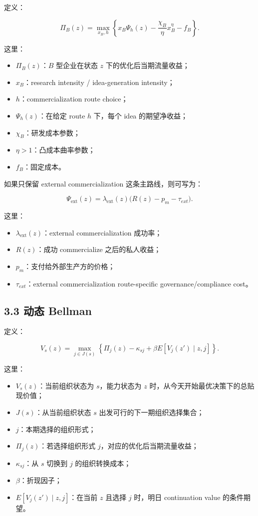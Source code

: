\documentclass[12pt]{ctexart}
\begin{document}
定义：

\[
\Pi_B(z)
=
\max_{x_B,h}
\left\{
x_B\Psi_h(z)-\frac{\chi_B}{\eta}x_B^\eta-f_B
\right\}.
\]

这里：

\begin{itemize}[leftmargin=2em]
    \item \(\Pi_B(z)\)：\(B\) 型企业在状态 \(z\) 下的优化后当期流量收益；
    \item \(x_B\)：research intensity / idea-generation intensity；
    \item \(h\)：commercialization route choice；
    \item \(\Psi_h(z)\)：在给定 route \(h\) 下，每个 idea 的期望净收益；
    \item \(\chi_B\)：研发成本参数；
    \item \(\eta>1\)：凸成本曲率参数；
    \item \(f_B\)：固定成本。
\end{itemize}

如果只保留 external commercialization 这条主路线，则可写为：

\[
\Psi_{\text{ext}}(z)
=
\lambda_{\text{ext}}(z)\bigl(R(z)-p_m-\tau_{ext}\bigr).
\]

这里：

\begin{itemize}[leftmargin=2em]
    \item \(\lambda_{\text{ext}}(z)\)：external commercialization 成功率；
    \item \(R(z)\)：成功 commercialize 之后的私人收益；
    \item \(p_m\)：支付给外部生产方的价格；
    \item \(\tau_{ext}\)：external commercialization route-specific governance/compliance cost。
\end{itemize}

\subsection{3.3 动态 Bellman}

定义：

\[
V_s(z)=
\max_{j\in J(s)}
\left\{
\Pi_j(z)-\kappa_{sj}
+\beta E[V_j(z')\mid z,j]
\right\}.
\]

这里：

\begin{itemize}[leftmargin=2em]
    \item \(V_s(z)\)：当前组织状态为 \(s\)，能力状态为 \(z\) 时，从今天开始最优决策下的总贴现价值；
    \item \(J(s)\)：从当前组织状态 \(s\) 出发可行的下一期组织选择集合；
    \item \(j\)：本期选择的组织形式；
    \item \(\Pi_j(z)\)：若选择组织形式 \(j\)，对应的优化后当期流量收益；
    \item \(\kappa_{sj}\)：从 \(s\) 切换到 \(j\) 的组织转换成本；
    \item \(\beta\)：折现因子；
    \item \(E[V_j(z')\mid z,j]\)：在当前 \(z\) 且选择 \(j\) 时，明日 continuation value 的条件期望。
\end{itemize}
\end{document}
